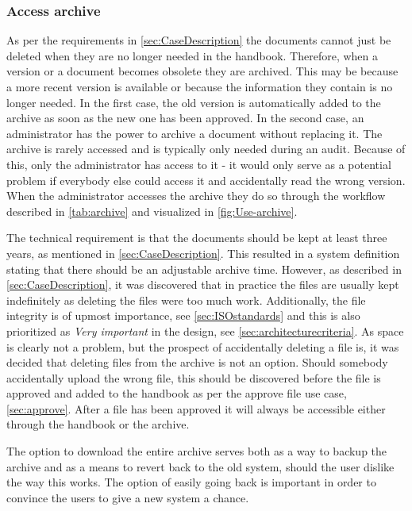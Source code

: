 \subsubsection{Access archive}\label{sec:access-archive}
As per the requirements in \cref{sec:CaseDescription} the documents cannot just be deleted when they are no longer needed in the handbook.
Therefore, when a version or a document becomes obsolete they are archived.
This may be because a more recent version is available or because the information they contain is no longer needed.
In the first case, the old version is automatically added to the archive as soon as the new one has been approved.
In the second case, an administrator has the power to archive a document without replacing it.
The archive is rarely accessed and is typically only needed during an audit.
Because of this, only the administrator has access to it - it would only serve as a potential problem if everybody else could access it and accidentally read the wrong version.
When the administrator accesses the archive they do so through the workflow described in \cref{tab:archive} and visualized in \cref{fig:Use-archive}.




The technical requirement is that the documents should be kept at least three years, as mentioned in \cref{sec:CaseDescription}.
This resulted in a system definition stating that there should be an adjustable archive time.
However, as described in \cref{sec:CaseDescription}, it was discovered that in practice the files are usually kept indefinitely as deleting the files were too much work.
Additionally, the file integrity is of upmost importance, see \cref{sec:ISOstandards} and this is also prioritized as \textit{Very important} in the design, see \cref{sec:architecturecriteria}.
As space is clearly not a problem, but the prospect of accidentally deleting a file is, it was decided that deleting files from the archive is not an option.
Should somebody accidentally upload the wrong file, this should be discovered before the file is approved and added to the handbook as per the approve file use case, \cref{sec:approve}.
After a file has been approved it will always be accessible either through the handbook or the archive.

The option to download the entire archive serves both as a way to backup the archive and as a means to revert back to the old system, should the user dislike the way this works.
The option of easily going back is important in order to convince the users to give a new system a chance.

